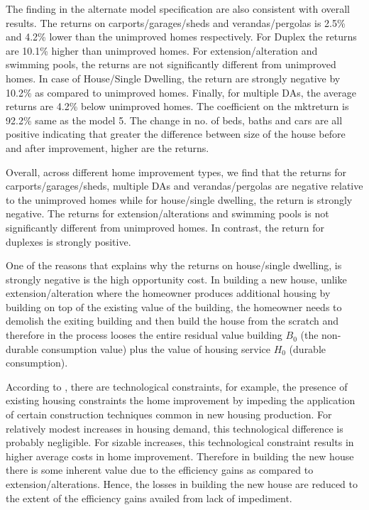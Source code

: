 \documentclass{article}
\begin{document}
The finding in the alternate model specification are also consistent with overall results. The returns on carports/garages/sheds and verandas/pergolas is 2.5\% and 4.2\% lower than the unimproved homes respectively. For Duplex the returns are 10.1\% higher than unimproved homes. For extension/alteration and swimming pools, the returns are not significantly different from unimproved homes. In case of House/Single Dwelling, the return are strongly negative by 10.2\% as compared to unimproved homes. Finally, for multiple DAs, the average returns are 4.2\% below unimproved homes. The coefficient on the mktreturn is 92.2\% same as the model 5. The change in no. of beds, baths and cars are all positive indicating that greater the difference between size of the house before and after improvement, higher are the returns. 

Overall, across different home improvement types, we find that the returns for carports/garages/sheds, multiple DAs and verandas/pergolas are negative relative to the unimproved homes while for house/single dwelling, the return is strongly negative. The returns for extension/alterations and swimming pools is not significantly different from unimproved homes. In contrast, the return for duplexes is strongly positive.

One of the reasons that explains why the returns on house/single dwelling, is strongly negative is the high opportunity cost. In building a new house, unlike extension/alteration where the homeowner produces additional housing by building on top of the existing value of the building, the homeowner needs to demolish the exiting building and then build the house from the scratch and therefore in the process looses the entire residual value building $B_0$ (the non-durable consumption value) plus the value of housing service $H_0$ (durable consumption). 

According to \citet{potepan1989interest}, there are technological constraints, for example, the presence of existing housing constraints the home improvement by impeding the application of certain construction techniques common in new housing production. For relatively modest increases in housing demand, this technological difference is probably negligible. For sizable increases, this technological constraint results in higher average costs in home improvement. Therefore in building the new house there is some inherent value due to the efficiency gains as compared to extension/alterations. Hence, the losses in building the new house are reduced to the extent of the efficiency gains availed from lack of impediment.
\end{document}
